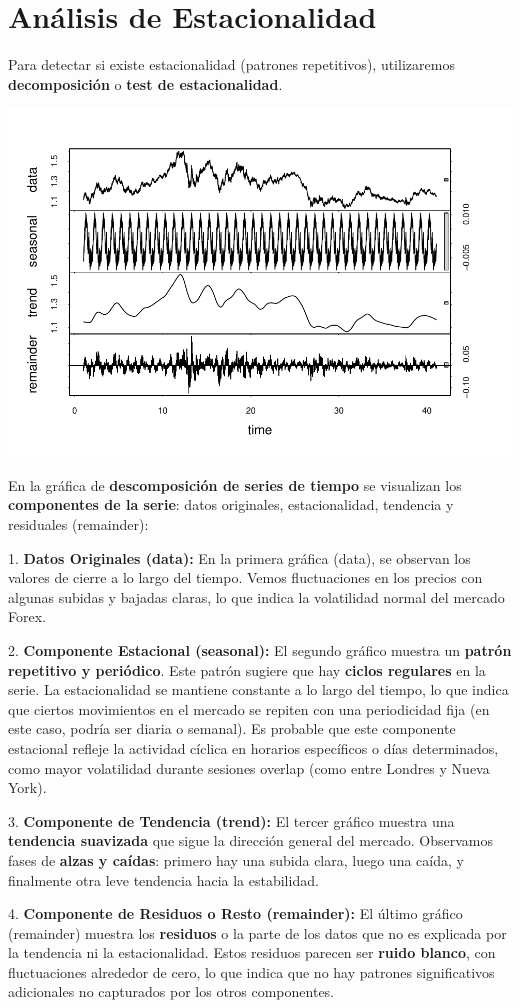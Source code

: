 \documentclass[
]{book}
\begin{document}
\section{Análisis de Estacionalidad}\label{anuxe1lisis-de-estacionalidad}

Para detectar si existe estacionalidad (patrones repetitivos), utilizaremos \textbf{decomposición} o \textbf{test de estacionalidad}.

\includegraphics{bookdown_time_series_files/figure-latex/unnamed-chunk-6-1.pdf}

En la gráfica de \textbf{descomposición de series de tiempo} se visualizan los \textbf{componentes de la serie}: datos originales, estacionalidad, tendencia y residuales (remainder):

1. \textbf{Datos Originales (data):} En la primera gráfica (data), se observan los valores de cierre a lo largo del tiempo. Vemos fluctuaciones en los precios con algunas subidas y bajadas claras, lo que indica la volatilidad normal del mercado Forex.

2. \textbf{Componente Estacional (seasonal):} El segundo gráfico muestra un \textbf{patrón repetitivo y periódico}. Este patrón sugiere que hay \textbf{ciclos regulares} en la serie. La estacionalidad se mantiene constante a lo largo del tiempo, lo que indica que ciertos movimientos en el mercado se repiten con una periodicidad fija (en este caso, podría ser diaria o semanal). Es probable que este componente estacional refleje la actividad cíclica en horarios específicos o días determinados, como mayor volatilidad durante sesiones overlap (como entre Londres y Nueva York).

3. \textbf{Componente de Tendencia (trend):} El tercer gráfico muestra una \textbf{tendencia suavizada} que sigue la dirección general del mercado. Observamos fases de \textbf{alzas y caídas}: primero hay una subida clara, luego una caída, y finalmente otra leve tendencia hacia la estabilidad.

4. \textbf{Componente de Residuos o Resto (remainder):} El último gráfico (remainder) muestra los \textbf{residuos} o la parte de los datos que no es explicada por la tendencia ni la estacionalidad. Estos residuos parecen ser \textbf{ruido blanco}, con fluctuaciones alrededor de cero, lo que indica que no hay patrones significativos adicionales no capturados por los otros componentes.

  
\end{document}
